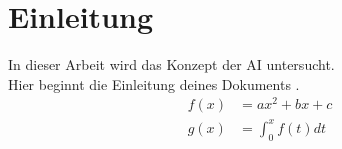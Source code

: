 
\section{Einleitung}
In dieser Arbeit wird das Konzept der \ac{AI} untersucht.\\
Hier beginnt die Einleitung deines Dokuments \cite{musterbuch}.
\begin{align}
    f(x) &= ax^2 + bx + c \\
    g(x) &= \int_{0}^{x} f(t) dt
\end{align}